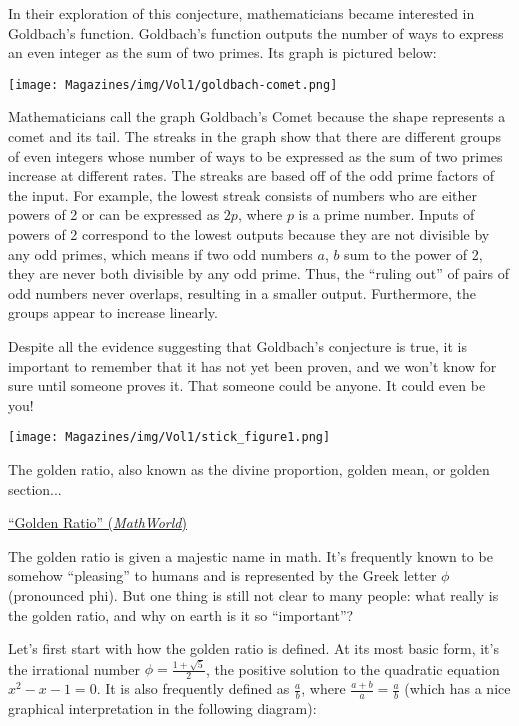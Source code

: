 \documentclass{article}
\begin{document}
\begin{multicols}{3}
{In their exploration of this conjecture, mathematicians became interested in Goldbach’s function. Goldbach’s function outputs the number of ways to express an even integer as the sum of two primes. Its graph is pictured below:
\begin{center}
    \texttt{[image: Magazines/img/Vol1/goldbach-comet.png]}
\end{center}
Mathematicians call the graph Goldbach’s Comet because the shape represents a comet and its tail. The streaks in the graph show that there are different groups of even integers whose number of ways to be expressed as the sum of two primes increase at different rates. The streaks are based off of the odd prime factors of the input. For example, the lowest streak consists of numbers who are either powers of 2 or can be expressed as $2p$, where $p$ is a prime number. Inputs of powers of 2 correspond to the lowest outputs because they are not divisible by any odd primes, which means if two odd numbers $a$, $b$ sum to the power of 2, they are never both divisible by any odd prime. Thus, the “ruling out” of pairs of odd numbers never overlaps, resulting in a smaller output. Furthermore, the groups appear to increase linearly.

Despite all the evidence suggesting that Goldbach’s conjecture is true, it is important to remember that it has not yet been proven, and we won’t know for sure until someone proves it. That someone could be anyone. It could even be you!
\begin{center}
    \texttt{[image: Magazines/img/Vol1/stick\_figure1.png]}
\end{center}
\closearticle
\clearcolumn
{}

\epigraph{
  The golden ratio, also known as the divine proportion, golden mean, or golden section...
}{\href{https://mathworld.wolfram.com/GoldenRatio.html}{``Golden Ratio'' (\emph{MathWorld})}}
The golden ratio is given a majestic name in math. It’s frequently known to be somehow “pleasing” to humans and is represented by the Greek letter $\phi$ (pronounced phi). But one thing is still not clear to many people: what really is the golden ratio, and why on earth is it so “important”? 

Let’s first start with how the golden ratio is defined. At its most basic form, it’s the irrational number $\phi = \frac{1+\sqrt5}2$, the positive solution to the quadratic equation $x^2-x-1=0$. It is also frequently defined as $\frac ab$, where $\frac{a+b}a = \frac ab$ (which has a nice graphical interpretation in the following diagram):

}
\end{multicols}
\end{document}
